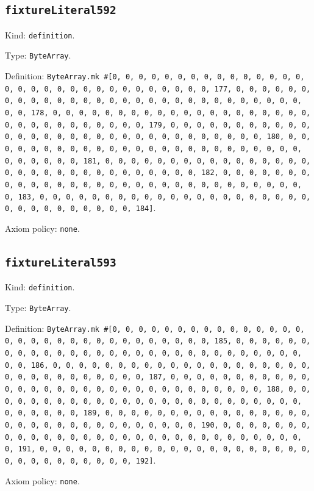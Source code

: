 \documentclass[11pt]{article}
\begin{document}
\subsection*{\texttt{fixtureLiteral592}}
\noindent Kind: \texttt{definition}.\par
\noindent Type: \texttt{ByteArray}.\par
\noindent Definition: \texttt{ByteArray.mk \#[0, 0, 0, 0, 0, 0, 0, 0, 0, 0, 0, 0, 0, 0, 0, 0, 0, 0, 0, 0, 0, 0, 0, 0, 0, 0, 0, 0, 0, 0, 0, 177, 0, 0, 0, 0, 0, 0, 0, 0, 0, 0, 0, 0, 0, 0, 0, 0, 0, 0, 0, 0, 0, 0, 0, 0, 0, 0, 0, 0, 0, 0, 0, 178, 0, 0, 0, 0, 0, 0, 0, 0, 0, 0, 0, 0, 0, 0, 0, 0, 0, 0, 0, 0, 0, 0, 0, 0, 0, 0, 0, 0, 0, 0, 0, 179, 0, 0, 0, 0, 0, 0, 0, 0, 0, 0, 0, 0, 0, 0, 0, 0, 0, 0, 0, 0, 0, 0, 0, 0, 0, 0, 0, 0, 0, 0, 0, 180, 0, 0, 0, 0, 0, 0, 0, 0, 0, 0, 0, 0, 0, 0, 0, 0, 0, 0, 0, 0, 0, 0, 0, 0, 0, 0, 0, 0, 0, 0, 0, 181, 0, 0, 0, 0, 0, 0, 0, 0, 0, 0, 0, 0, 0, 0, 0, 0, 0, 0, 0, 0, 0, 0, 0, 0, 0, 0, 0, 0, 0, 0, 0, 182, 0, 0, 0, 0, 0, 0, 0, 0, 0, 0, 0, 0, 0, 0, 0, 0, 0, 0, 0, 0, 0, 0, 0, 0, 0, 0, 0, 0, 0, 0, 0, 183, 0, 0, 0, 0, 0, 0, 0, 0, 0, 0, 0, 0, 0, 0, 0, 0, 0, 0, 0, 0, 0, 0, 0, 0, 0, 0, 0, 0, 0, 0, 0, 184]}.\par
\noindent Axiom policy: \texttt{none}.\par
\subsection*{\texttt{fixtureLiteral593}}
\noindent Kind: \texttt{definition}.\par
\noindent Type: \texttt{ByteArray}.\par
\noindent Definition: \texttt{ByteArray.mk \#[0, 0, 0, 0, 0, 0, 0, 0, 0, 0, 0, 0, 0, 0, 0, 0, 0, 0, 0, 0, 0, 0, 0, 0, 0, 0, 0, 0, 0, 0, 0, 185, 0, 0, 0, 0, 0, 0, 0, 0, 0, 0, 0, 0, 0, 0, 0, 0, 0, 0, 0, 0, 0, 0, 0, 0, 0, 0, 0, 0, 0, 0, 0, 186, 0, 0, 0, 0, 0, 0, 0, 0, 0, 0, 0, 0, 0, 0, 0, 0, 0, 0, 0, 0, 0, 0, 0, 0, 0, 0, 0, 0, 0, 0, 0, 187, 0, 0, 0, 0, 0, 0, 0, 0, 0, 0, 0, 0, 0, 0, 0, 0, 0, 0, 0, 0, 0, 0, 0, 0, 0, 0, 0, 0, 0, 0, 0, 188, 0, 0, 0, 0, 0, 0, 0, 0, 0, 0, 0, 0, 0, 0, 0, 0, 0, 0, 0, 0, 0, 0, 0, 0, 0, 0, 0, 0, 0, 0, 0, 189, 0, 0, 0, 0, 0, 0, 0, 0, 0, 0, 0, 0, 0, 0, 0, 0, 0, 0, 0, 0, 0, 0, 0, 0, 0, 0, 0, 0, 0, 0, 0, 190, 0, 0, 0, 0, 0, 0, 0, 0, 0, 0, 0, 0, 0, 0, 0, 0, 0, 0, 0, 0, 0, 0, 0, 0, 0, 0, 0, 0, 0, 0, 0, 191, 0, 0, 0, 0, 0, 0, 0, 0, 0, 0, 0, 0, 0, 0, 0, 0, 0, 0, 0, 0, 0, 0, 0, 0, 0, 0, 0, 0, 0, 0, 0, 192]}.\par
\noindent Axiom policy: \texttt{none}.\par
\end{document}
